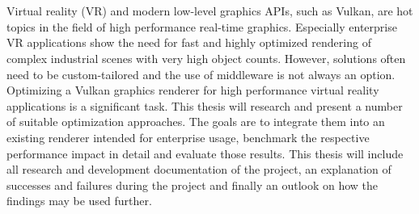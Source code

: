 \chapter{\abstractname}

Virtual reality (VR) and modern low-level graphics APIs, such as Vulkan, are hot topics in the field of high performance real-time graphics. Especially enterprise VR applications show the need for fast and highly optimized rendering of complex industrial scenes with very high object counts. However, solutions often need to be custom-tailored and the use of middleware is not always an option. Optimizing a Vulkan graphics renderer for high performance virtual reality applications is a significant task. This thesis will research and present a number of suitable optimization approaches. The goals are to integrate them into an existing renderer intended for enterprise usage, benchmark the respective performance impact in detail and evaluate those results. This thesis will include all research and development documentation of the project, an explanation of successes and failures during the project and finally an outlook on how the findings may be used further.  





\makeatletter
{}
{\renewcommand{\abstractname}{Kurzfassung}}
{\renewcommand{\abstractname}{Abstract}}
\makeatother

\chapter{\abstractname}

\begin{otherlanguage}{ngerman} %

\end{otherlanguage}


\makeatletter
{}
{\renewcommand{\abstractname}{Abstract}}
{\renewcommand{\abstractname}{Kurzfassung}}
\makeatother